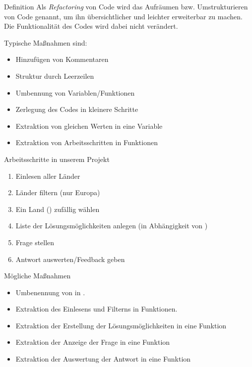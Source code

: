 \begin{frame}
\begin{block}{Definition}
\vspace{2pt}
Als \emph{Refactoring} von Code wird das Aufräumen bzw. Umstrukturieren von Code genannt, um ihn übersichtlicher und leichter erweiterbar zu machen. 
Die Funktionalität des Codes wird dabei nicht verändert. 
\pause

Typische Maßnahmen sind: 
\pause 
\begin{itemize}[<+->]
	\item Hinzufügen von Kommentaren
	\item Struktur durch Leerzeilen
	\item Umbennung von Variablen/Funktionen
	\item Zerlegung des Codes in kleinere Schritte
	\item Extraktion von gleichen Werten in eine Variable
	\item Extraktion von Arbeitsschritten in Funktionen
\end{itemize}
\end{block}
\end{frame}



\begin{frame}
	
\begin{block}{Arbeitsschritte in unserem Projekt}
\vspace{2pt}
\pause 
\begin{enumerate}[<+->]
	\item Einlesen aller Länder
	\item Länder filtern (nur Europa)
	\item Ein Land () zufällig wählen
	\item Liste der Lösungsmöglichkeiten anlegen (in Abhängigkeit von )
	\item Frage stellen
	\item Antwort auswerten/Feedback geben
\end{enumerate}
\end{block}
	
\end{frame}

\begin{frame}
	\begin{block}{Mögliche Maßnahmen}
		\vspace{2pt}
	\pause 
	\begin{itemize}[<+->]
	\item Umbenennung von  in .
	\item Extraktion des Einlesens und Filterns in Funktionen.
    \item Extraktion der Erstellung der Lösungsmöglichkeiten in eine Funktion
    \item Extraktion der Anzeige der Frage in eine Funktion
    \item Extraktion der Auswertung der Antwort in eine Funktion 
	\end{itemize}	
	\end{block}
\end{frame}


